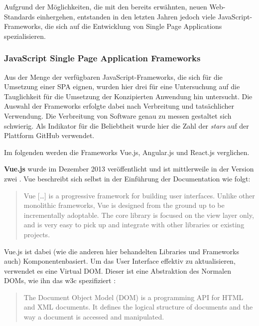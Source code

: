 Aufgrund der Möglichkeiten, die mit den bereits erwähnten, neuen Web-Standards einhergehen, entstanden in den letzten Jahren jedoch viele JavaScript-Frameworks, die sich auf die Entwicklung von Single Page Applications spezialisieren.


\subsubsection{JavaScript Single Page Application Frameworks}

Aus der Menge der verfügbaren JavaScript-Frameworks, die sich für die Umsetzung einer SPA eignen, wurden hier drei für eine Untersuchung auf die Tauglichkeit für die Umsetzung der Konzipierten Anwendung hin untersucht.
Die Auswahl der Frameworks erfolgte dabei nach Verbreitung und tatsächlicher Verwendung. Die Verbreitung von Software genau zu messen gestaltet sich schwierig. Als Indikator für die Beliebtheit wurde hier die Zahl der \textit{stars}\footnotemark{} auf der Plattform GitHub verwendet.


Im folgenden werden die Frameworks Vue.js, Angular.js und React.js verglichen.

\textbf{Vue.js} wurde im Dezember 2013 veröffentlicht und ist mittlerweile in der Version zwei .
Vue beschreibt sich selbst in der Einführung der Documentation wie folgt:

\begin{quote}
  Vue […] is a progressive framework for building user interfaces. Unlike other monolithic frameworks, Vue is designed from the ground up to be incrementally adoptable. The core library is focused on the view layer only, and is very easy to pick up and integrate with other libraries or existing projects. \cite{VueIntro}
\end{quote}

Vue.js ist dabei (wie die anderen hier behandelten Libraries und Frameworks auch) Komponentenbasiert. Um das User Interface effektiv zu aktualisieren, verwendet es eine Virtual DOM. Dieser ist eine Abstraktion des Normalen DOMs, wie ihn das w3c spezifiziert \cite{w3cDOM}:

\begin{quote}
  The Document Object Model (DOM) is a programming API for HTML and XML documents. It defines the logical structure of documents and the way a document is accessed and manipulated.
\end{quote}


